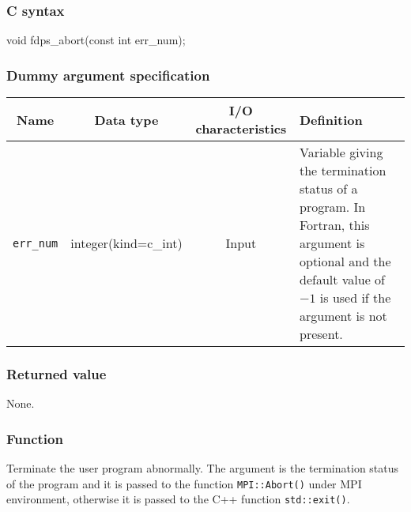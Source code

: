 \subsubsection*{C syntax}
\begin{screen}
\begin{spverbatim}
void fdps_abort(const int err_num);
\end{spverbatim}
\end{screen}

\subsubsection*{Dummy argument specification}
\begin{table}[h]
\begin{tabularx}{\linewidth}{cccX}
\toprule
\rowcolor{Snow2}
Name & Data type & I/O characteristics & Definition \\
\midrule
\texttt{err\_num} & integer(kind=c\_int) & Input & Variable giving the termination status of a program. In Fortran, this argument is optional and the default value of $-1$ is used if the argument is not present. \\
\bottomrule
\end{tabularx}
\end{table}

\subsubsection*{Returned value}
None.

\subsubsection*{Function}
Terminate the user program abnormally. The argument is the termination status of the program and it is passed to the function \texttt{MPI::Abort()} under MPI environment, otherwise it is passed to the C++ function \texttt{std::exit()}.

\clearpage

